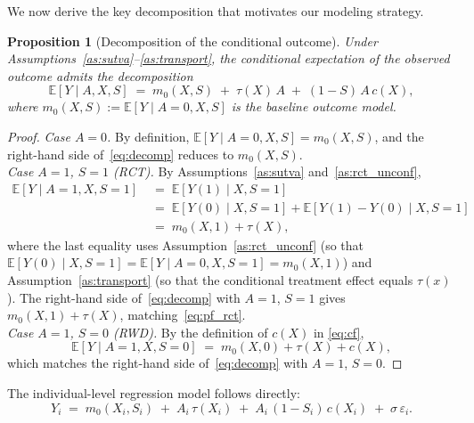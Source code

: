 \documentclass[10pt]{article}
\theoremstyle{plain}
\newtheorem{proposition}{Proposition}
\theoremstyle{definition}
\theoremstyle{remark}
\newcommand{\E}{\mathbb{E}}
\newcommand{\CATE}{\tau}
\newcommand{\cf}{c}
\begin{document}
We now derive the key decomposition that motivates our modeling strategy.

\begin{proposition}[Decomposition of the conditional outcome]\label{prop:decomp}
  Under Assumptions~\ref{as:sutva}--\ref{as:transport}, the conditional expectation of the observed outcome admits the decomposition
  \begin{equation}\label{eq:decomp}
    \E[Y \mid A, X, S] \;=\; m_0(X, S) \;+\; \CATE(X)\,A \;+\; (1 - S)\,A\,\cf(X),
  \end{equation}
  where $m_0(X, S) := \E[Y \mid A = 0, X, S]$ is the baseline outcome model.
\end{proposition}

\begin{proof}
  \emph{Case $A=0$.} By definition, $\E[Y \mid A{=}0, X, S] = m_0(X, S)$, and the right-hand side of~\eqref{eq:decomp} reduces to $m_0(X,S)$. \\[6pt]
  \emph{Case $A=1$, $S=1$ (RCT).} By Assumptions~\ref{as:sutva} and~\ref{as:rct_unconf},
  \begin{align}
    \E[Y \mid A{=}1, X, S{=}1] &\;=\; \E[Y(1) \mid X, S{=}1] \nonumber\\
    &\;=\; \E[Y(0) \mid X, S{=}1] + \E[Y(1) - Y(0) \mid X, S{=}1] \nonumber\\
    &\;=\; m_0(X, 1) + \CATE(X), \label{eq:pf_rct}
  \end{align}
  where the last equality uses Assumption~\ref{as:rct_unconf} (so that $\E[Y(0) \mid X, S{=}1] = \E[Y \mid A{=}0, X, S{=}1] = m_0(X,1)$) and Assumption~\ref{as:transport} (so that the conditional treatment effect equals $\CATE(x)$). The right-hand side of~\eqref{eq:decomp} with $A=1$, $S=1$ gives $m_0(X,1) + \CATE(X)$, matching~\eqref{eq:pf_rct}.\\[6pt]
  \emph{Case $A=1$, $S=0$ (RWD).} By the definition of $\cf(X)$ in \eqref{eq:cf},
  \begin{equation*}
    \E[Y \mid A{=}1, X, S{=}0] \;=\; m_0(X, 0) + \CATE(X) + \cf(X),
  \end{equation*}
  which matches the right-hand side of~\eqref{eq:decomp} with $A=1$, $S=0$.
\end{proof}

\noindent The individual-level regression model follows directly:
\begin{equation}\label{eq:individual}
  Y_i \;=\; m_0(X_i, S_i) \;+\; A_i\,\CATE(X_i) \;+\; A_i\,(1 - S_i)\,\cf(X_i) \;+\; \sigma\,\varepsilon_i.
\end{equation}
\end{document}
